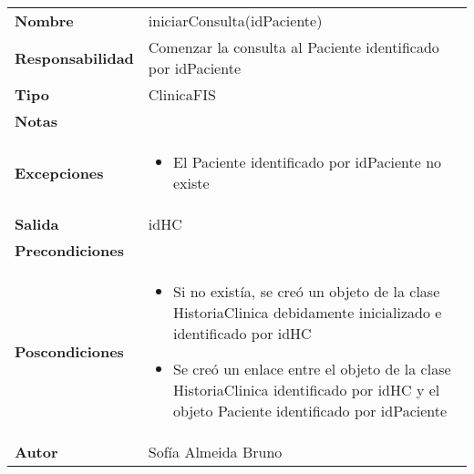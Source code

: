 \documentclass[11pt,a4paper]{article}
\newenvironment{itemizenomargins}
    {\begin{minipage}[t]{1\linewidth}\begin{itemize}}
    {\end{itemize}\end{minipage}}
\begin{document}
\begin{table}[H]
\centering
\label{my-label}
\begin{tabularx}{\textwidth}{l|X}
\textbf{Nombre}          & iniciarConsulta(idPaciente) \\
\textbf{Responsabilidad} & Comenzar la consulta al Paciente identificado por idPaciente\\
\textbf{Tipo}            & ClinicaFIS \\
\textbf{Notas}           &  \\
\textbf{Excepciones}     & 
\begin{itemizenomargins}
\item El Paciente identificado por idPaciente no existe
\end{itemizenomargins}\\
\textbf{Salida}          &  idHC\\
\textbf{Precondiciones}  &  \\
\textbf{Poscondiciones}  &
\begin{itemizenomargins}
\item Si no existía, se creó un objeto de la clase HistoriaClinica debidamente inicializado e identificado por idHC
\item Se creó un enlace entre el objeto de la clase HistoriaClinica identificado por idHC y el objeto Paciente identificado por idPaciente
\end{itemizenomargins}\\
\textbf{Autor}           & Sofía Almeida Bruno
\end{tabularx}
\end{table}
\end{document}
